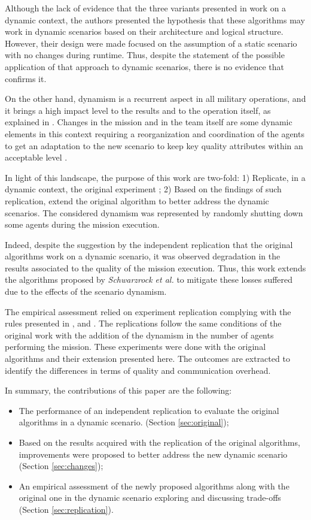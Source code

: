 Although the lack of evidence that the three variants presented in \cite{MAS07} work on a dynamic context, the authors presented the hypothesis that these algorithms may work in dynamic scenarios based on their architecture and logical structure. However, their design were made focused on the assumption of a static scenario with no changes during runtime. Thus, despite the statement of the possible application of that approach to dynamic scenarios, there is no evidence that confirms it.

On the other hand, dynamism is a recurrent aspect in all military operations, and it brings a high impact level to the results and to the operation itself, as explained in \cite{CC02}. Changes in the mission and in the team itself are some dynamic elements in this context requiring a reorganization and coordination of the agents to get an adaptation to the new scenario to keep key quality attributes within an acceptable level \cite{FRANCE2014}. 

In light of this landscape, the purpose of this work are two-fold: 1) Replicate, in a dynamic context, the original experiment \cite{MAS07}; 2) Based on the findings of such replication, extend the original algorithm to better address the dynamic scenarios. The considered dynamism was represented by randomly shutting down some agents during the mission execution.

Indeed, despite the suggestion by the independent replication that the original algorithms work \cite{MAS07} on a dynamic scenario, it was observed degradation in the results associated to the quality of the mission execution. Thus, this work extends the algorithms proposed by \textit{Schwarzrock et al.} to mitigate these losses suffered due to the effects of the scenario dynamism.

The empirical assessment relied on experiment replication complying with the rules presented in \cite{exp01}, \cite{exp03} and \cite{exp04}. The replications follow the same conditions of the original work with the addition of the dynamism in the number of agents performing the mission. These experiments were done with the original algorithms and their extension presented here. The outcomes are extracted to identify the differences in terms of quality and communication overhead.

In summary, the contributions of this paper are the following:

\begin{itemize}
   \item The performance of an independent replication to evaluate the original algorithms in a dynamic scenario. (Section \ref{sec:original});
   \item Based on the results acquired with the replication of the original algorithms, improvements were proposed to better address the new dynamic scenario (Section \ref{sec:changes});
   \item An empirical assessment of the newly proposed algorithms along with the original one in the dynamic scenario exploring and discussing trade-offs (Section \ref{sec:replication}).
\end{itemize}

